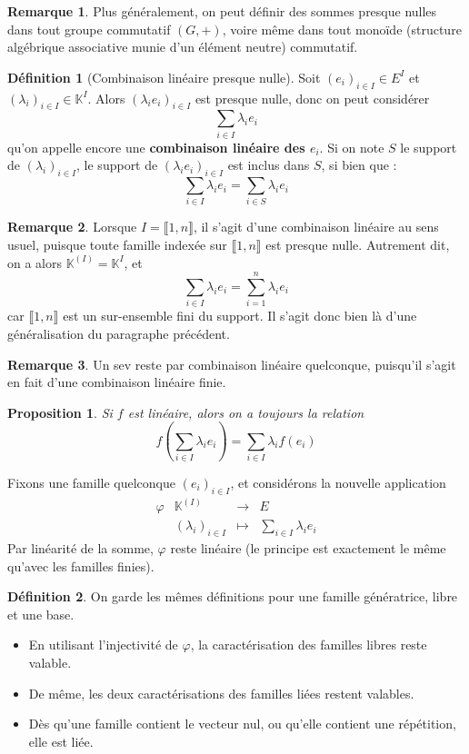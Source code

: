 \documentclass[french]{book}
\newcommand{\K}{\mathbb{K}}
\theoremstyle{plain}
\newtheorem{prop}{Proposition}[chapter]
\theoremstyle{definition}
\newtheorem{dfn}{Définition}[chapter]
\newtheorem{rmq}{Remarque}[chapter]
\theoremstyle{remark}
\begin{document}
\begin{rmq}
	Plus généralement, on peut définir des sommes presque nulles dans tout groupe commutatif $(G,+)$, voire même dans tout monoïde (structure algébrique associative munie d'un élément neutre) commutatif.
\end{rmq}
\begin{dfn}[Combinaison linéaire presque nulle]
	Soit $(e_i)_{i\in I}\in E^I$ et $(\lambda_i)_{i\in I}\in\K^I$. Alors $(\lambda_ie_i)_{i\in I}$ est presque nulle, donc on peut considérer $$\sum_{i\in I}\lambda_ie_i$$ qu'on appelle encore une \textbf{combinaison linéaire des $e_i$}. Si on note $S$ le support de $(\lambda_i)_{i\in I}$, le support de $(\lambda_ie_i)_{i\in I}$ est inclus dans $S$, si bien que :$$\sum_{i\in I}\lambda_ie_i=\sum_{i\in S}\lambda_ie_i$$
\end{dfn}
\begin{rmq}
	Lorsque $I=\llbracket1,n\rrbracket$, il s'agit d'une combinaison linéaire au sens usuel, puisque toute famille indexée sur $\llbracket1,n\rrbracket$ est presque nulle. Autrement dit, on a alors $\K^{(I)}=\K^I$, et $$\sum_{i\in I}\lambda_ie_i=\sum_{i=1}^{n}\lambda_ie_i$$ car $\llbracket1,n\rrbracket$ est un sur-ensemble fini du support. Il s'agit donc bien là d'une généralisation du paragraphe précédent.
\end{rmq}
\begin{rmq}
	Un sev reste par combinaison linéaire quelconque, puisqu'il s'agit en fait d'une combinaison linéaire finie.
\end{rmq}
\begin{prop}
	Si $f$ est linéaire, alors on a toujours la relation $$f\left(\sum_{i\in I}\lambda_ie_i\right)=\sum_{i\in I}\lambda_if(e_i)$$
\end{prop}
Fixons une famille quelconque $(e_i)_{i\in I}$, et considérons la nouvelle application $$\begin{array}{cccc}\varphi&\K^{(I)}&\rightarrow&E\\&(\lambda_i)_{i\in I}&\mapsto&\sum_{i\in I}\lambda_i e_i\end{array}$$ Par linéarité de la somme, $\varphi$ reste linéaire (le principe est exactement le même qu'avec les familles finies).
\begin{dfn}
	On garde les mêmes définitions pour une famille génératrice, libre et une base.
	\begin{itemize}
		\item En utilisant l'injectivité de $\varphi$, la caractérisation des familles libres reste valable.
		\item De même, les deux caractérisations des familles liées restent valables.
		\item Dès qu'une famille contient le vecteur nul, ou qu'elle contient une répétition, elle est liée.
	\end{itemize}
\end{dfn}
\end{document}
